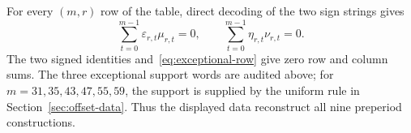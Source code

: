 \endgroup
For every $(m,r)$ row of the table, direct decoding of the two sign strings gives
\[
\sum_{t=0}^{m-1}\varepsilon_{r,t}\mu_{r,t}=0,
\qquad \sum_{t=0}^{m-1}\eta_{r,t}\nu_{r,t}=0.
\]
The two signed identities and~\eqref{eq:exceptional-row} give zero row and column sums.
The three exceptional support words are audited above;
for $m=31,35,43,47,55,59$, the support is supplied by the uniform rule in
Section~\ref{sec:offset-data}. Thus the displayed data reconstruct all nine preperiod constructions.
